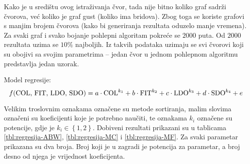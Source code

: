 \documentclass[times, utf8, diplomski, numeric]{fer}
\begin{document}
Kako je u središtu ovog istraživanja čvor, tada nije bitno koliko graf sadrži čvorova, već koliko je graf gust (koliko ima bridova). Zbog toga se koriste grafovi s manjim brojem čvorova (kako bi generiranja rezultata oduzelo manje vremena). Za svaki graf i svako bojanje pohlepni algoritam pokreće se $2000$ puta. Od $2000$ rezultata uzima se $10\%$ najboljih. Iz takvih podataka uzimaju se svi čvorovi koji su obojivi sa svojim parametrima -- jedan čvor u jednom pohlepnom algoritmu predstavlja jedan uzorak.

Model regresije:
\begin{equation}
	f(\textup{COL, FIT, LDO, SDO}) = a\cdot \textup{COL}^{k_1} + b\cdot \textup{FIT}^{k_2} + c\cdot \textup{LDO}^{k_3} + d\cdot \textup{SDO}^{k_4} + e
\end{equation}

Velikim troslovnim oznakama označene su metode sortiranja, malim slovima označeni su koeficijenti koje je potrebno naučiti, te oznakama $k_i$ označene su potencije, gdje je $k_i \in \left \{ 1, 2 \right \} $.
Dobiveni rezultati prikazani su u tablicama \ref{tbl:regresija-ABW}, \ref{tbl:regresija-MC} i \ref{tbl:regresija-MF}. Za svaki parametar prikazana su dva broja. Broj koji je u zagradi je potencija za parametar, a broj desno od njega je vrijednost koeficijenta.
\end{document}

